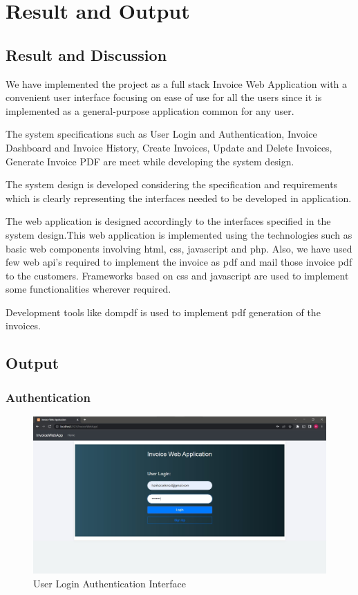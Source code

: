 \chapter{Result and Output}

\section{Result and Discussion}
We have implemented the project as a full stack Invoice Web Application with a convenient user interface focusing on ease of use for all the users since it is implemented as a general-purpose application common for any user.  

The system specifications such as User Login and Authentication, Invoice Dashboard and Invoice History, Create Invoices, Update and Delete Invoices, Generate Invoice PDF are meet while developing the system design.

The system design is developed considering the specification and requirements which is clearly representing the interfaces needed to be developed in application.

The web application is designed accordingly to the interfaces specified in the system design.This web application is implemented using the technologies such as basic web components involving html, css, javascript and php. Also, we have used few web api's required to implement the invoice as pdf and mail those invoice pdf to the customers. Frameworks based on css and javascript are used to implement some functionalities wherever required. 

Development tools like dompdf is used to implement pdf generation of the invoices.

\section{Output}

\subsection{Authentication}

\begin{figure}[h]\centering
	\includegraphics[width=6in]{./images/login.jpg}
	\caption{User Login Authentication Interface}\label{login}
\end{figure}



